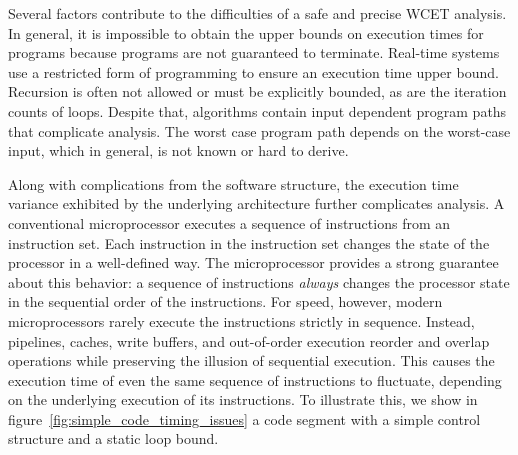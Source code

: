 Several factors contribute to the difficulties of a safe and precise WCET analysis.
In general, it is impossible to obtain the upper bounds on execution times for programs because programs are not guaranteed to terminate.  
Real-time systems use a restricted form of programming to ensure an execution time upper bound.
Recursion is often not allowed or must be explicitly bounded, as are the iteration counts of loops. 
Despite that, algorithms contain input dependent program paths that complicate analysis.    
The worst case program path depends on the worst-case input, which in general, is not known or hard to derive.    

Along with complications from the software structure, the execution time variance exhibited by the underlying architecture further complicates analysis.   
A conventional microprocessor executes a sequence of instructions from an instruction set. 
Each instruction in the instruction set changes the state of the processor in a well-defined way.
The microprocessor provides a strong guarantee about this behavior: a sequence of instructions \emph{always} changes the processor state in the sequential order of the instructions.        
For speed, however, modern microprocessors rarely execute the instructions strictly in sequence. 
Instead, pipelines, caches, write buffers, and out-of-order execution reorder and overlap operations while preserving the illusion of sequential execution.  
This causes the execution time of even the same sequence of instructions to fluctuate, depending on the underlying execution of its instructions.
To illustrate this, we show in figure~\ref{fig:simple_code_timing_issues} a code segment with a simple control structure and a static loop bound.

